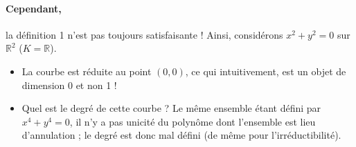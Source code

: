 \documentclass[a4paper, 11pt]{article}
\theoremstyle{definition}
\newcommand{\real}{\mathbb{R}}
\begin{document}
\paragraph{Cependant,} la définition 1 n'est pas toujours satisfaisante !
Ainsi, considérons $x^2 + y^2 = 0$ sur $\real^2$ ($K = \real$).
\begin{itemize}
\item La courbe est réduite au point $(0,0)$, ce qui intuitivement,
  est un objet de dimension 0 et non 1 !
\item Quel est le degré de cette courbe ? Le même ensemble étant
  défini par $x^4 + y^4 = 0$, il n'y a pas unicité du polynôme dont
  l'ensemble est lieu d'annulation ; le degré est donc mal défini (de
  même pour l'irréductibilité).
\end{itemize}
\end{document}
